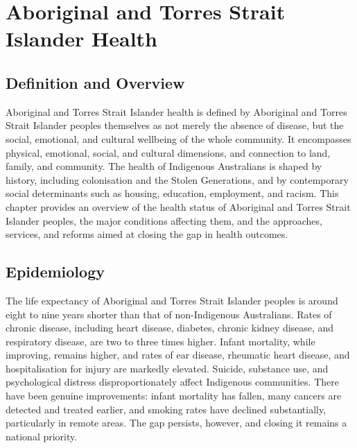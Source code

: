 \chapter{Aboriginal and Torres Strait Islander Health}

\section*{Definition and Overview}
Aboriginal and Torres Strait Islander health is defined by Aboriginal and Torres Strait Islander peoples themselves as not merely the absence of disease, but the social, emotional, and cultural wellbeing of the whole community. It encompasses physical, emotional, social, and cultural dimensions, and connection to land, family, and community. The health of Indigenous Australians is shaped by history, including colonisation and the Stolen Generations, and by contemporary social determinants such as housing, education, employment, and racism. This chapter provides an overview of the health status of Aboriginal and Torres Strait Islander peoples, the major conditions affecting them, and the approaches, services, and reforms aimed at closing the gap in health outcomes.

\section*{Epidemiology}
The life expectancy of Aboriginal and Torres Strait Islander peoples is around eight to nine years shorter than that of non-Indigenous Australians. Rates of chronic disease, including heart disease, diabetes, chronic kidney disease, and respiratory disease, are two to three times higher. Infant mortality, while improving, remains higher, and rates of ear disease, rheumatic heart disease, and hospitalisation for injury are markedly elevated. Suicide, substance use, and psychological distress disproportionately affect Indigenous communities. There have been genuine improvements: infant mortality has fallen, many cancers are detected and treated earlier, and smoking rates have declined substantially, particularly in remote areas. The gap persists, however, and closing it remains a national priority.

